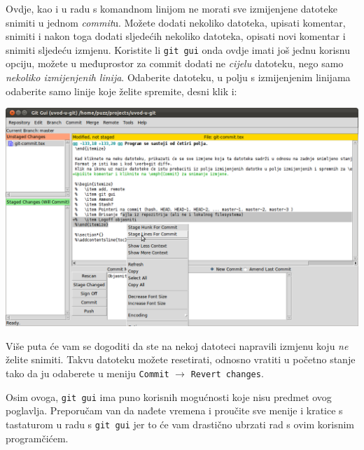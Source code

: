 Ovdje, kao i u radu s komandnom linijom ne morati sve izmijenjene datoteke snimiti u jednom \emph{commit}u. 
Možete dodati nekoliko datoteka, upisati komentar, snimiti i nakon toga dodati sljedećih nekoliko datoteka, opisati novi komentar i snimiti sljedeću izmjenu.
Koristite li \verb+git gui+ onda ovdje imati još jednu korisnu opciju, možete u međuprostor za commit dodati ne \emph{cijelu} datoteku, nego samo \emph{nekoliko izmijenjenih linija}.
Odaberite datoteku, u polju s izmijenjenim linijama odaberite samo linije koje želite spremite, desni klik i:

\includegraphics[width=14cm]{images/git-gui-stage-lines-to-commit.png}

Više puta će vam se dogoditi da ste na nekoj datoteci napravili izmjenu koju \emph{ne} želite snimiti. 
Takvu datoteku možete resetirati, odnosno vratiti u početno stanje tako da ju odaberete u meniju \verb+Commit+ $\rightarrow$ \verb+Revert changes+.

Osim ovoga, \verb+git gui+ ima puno korisnih mogućnosti koje nisu predmet ovog poglavlja.
Preporučam van da nađete vremena i proučite sve menije i kratice s tastaturom u radu s \verb+git gui+ jer to će vam drastično ubrzati rad s ovim korisnim programčićem.



